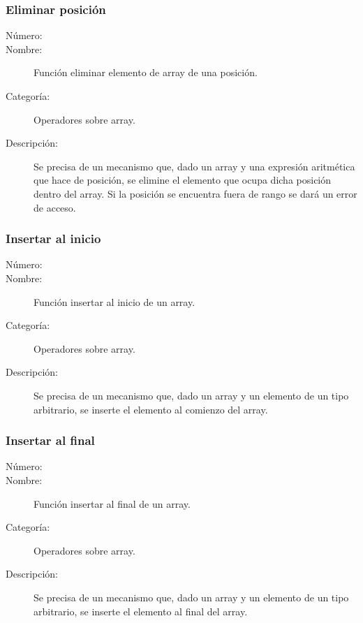 \subsubsection{Eliminar posición}
\begin{framed}
	\begin{description}
		\item [Número:] \cn
		\item [Nombre:] Función eliminar elemento de array de una posición.
		\item [Categoría:] Operadores sobre array.
		\item [Descripción:] Se precisa de un mecanismo que, dado un array y una expresión aritmética que hace de posición, se elimine el elemento que ocupa dicha posición dentro del array.
Si la posición se encuentra fuera de rango se dará un error de acceso.
	\end {description}
\end{framed}

\subsubsection{Insertar al inicio}
\begin{framed}
	\begin{description}
		\item [Número:] \cn
		\item [Nombre:] Función insertar al inicio de un array.
		\item [Categoría:] Operadores sobre array.
		\item [Descripción:] Se precisa de un mecanismo que, dado un array y un elemento de un tipo arbitrario, se inserte el elemento al comienzo del array.
	\end {description}
\end{framed}

\subsubsection{Insertar al final}
\begin{framed}
	\begin{description}
		\item [Número:] \cn
		\item [Nombre:] Función insertar al final de un array.
		\item [Categoría:] Operadores sobre array.
		\item [Descripción:] Se precisa de un mecanismo que, dado un array y un elemento de un tipo arbitrario, se inserte el elemento al final del array.
	\end {description}
\end{framed}

